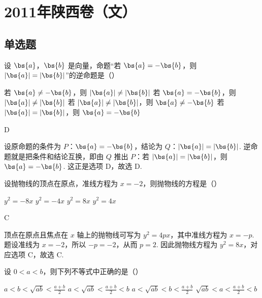 
\chapter{2011年陕西卷（文）}

\section{单选题}

\begin{problem}
设 \(\bs{a}\)，\(\bs{b}\) 是向量，命题“若 \(\bs{a} = -\bs{b}\)，则 \(|\bs{a}| = |\bs{b}|\)”的逆命题是（\quad）

\choices
    {若 \(\bs{a} \neq -\bs{b}\)，则 \(|\bs{a}| \neq |\bs{b}|\)}
    {若 \(\bs{a} = -\bs{b}\)，则 \(|\bs{a}| \neq |\bs{b}|\)}
    {若 \(|\bs{a}| \neq |\bs{b}|\)，则 \(\bs{a} \neq -\bs{b}\)}
    {若 \(|\bs{a}| = |\bs{b}|\)，则 \(\bs{a} = -\bs{b}\)}
\end{problem}

\begin{answer}
D
\end{answer}

\begin{solution}
设原命题的条件为 \(P\)：\(\bs{a}=-\bs{b}\)，结论为 \(Q\)：\(|\bs{a}|=|\bs{b}|\). 逆命题就是把条件和结论互换，即由 \(Q\) 推出 \(P\)：若 \(|\bs{a}|=|\bs{b}|\)，则 \(\bs{a}=-\bs{b}\). 这正是选项 D，故选 D.
\end{solution}

\begin{problem}
设抛物线的顶点在原点，准线方程为 \(x = -2\)，则抛物线的方程是（\quad）

\choices
    {\( y^{2} = -8x \)}
    {\( y^{2} = -4x \)}
    {\( y^{2} = 8x \)}
    {\( y^{2} = 4x \)}
\end{problem}

\begin{answer}
C
\end{answer}

\begin{solution}
顶点在原点且焦点在 \(x\) 轴上的抛物线可写为 \(y^2=4px\)，其中准线方程为 \(x=-p\). 题设准线为 \(x=-2\)，所以 \(-p=-2\)，从而 \(p=2\). 因此抛物线方程为 \(y^2=8x\)，对应选项 C，故选 C.
\end{solution}

\begin{problem}
设 \(0 < a < b\)，则下列不等式中正确的是（\quad）

\choices
    {\(a < b < \sqrt{ab} < \frac{a + b}{2}\)}
    {\(a < \sqrt{ab} < \frac{a + b}{2} < b\)}
    {\(a < \sqrt{ab} < b < \frac{a + b}{2}\)}
    {\(\sqrt{ab} < a < \frac{a + b}{2} < b\)}
\end{problem}

